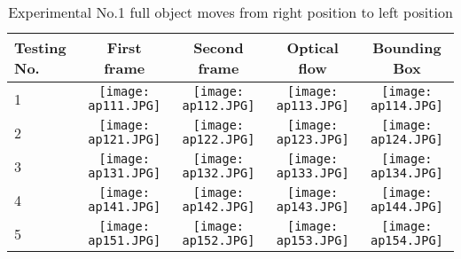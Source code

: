\begin{table}[h]
	\begin{adjustwidth}{-1.2in}{-1.2in}%
		\begin{tabular}{|p{1.1cm}|c|c|c|c|}
			\hline
			Testing No. & First frame & Second frame & Optical flow & Bounding Box \\ \hline
			1 & 
			\texttt{[image: ap111.JPG]} & \texttt{[image: ap112.JPG]} & \texttt{[image: ap113.JPG]} & \texttt{[image: ap114.JPG]} \\
			2 & 
			\texttt{[image: ap121.JPG]} & \texttt{[image: ap122.JPG]} & \texttt{[image: ap123.JPG]} & \texttt{[image: ap124.JPG]} \\
			3 & 
			\texttt{[image: ap131.JPG]} & \texttt{[image: ap132.JPG]} & \texttt{[image: ap133.JPG]} & \texttt{[image: ap134.JPG]} \\
			4 & 
			\texttt{[image: ap141.JPG]} & \texttt{[image: ap142.JPG]} & \texttt{[image: ap143.JPG]} & \texttt{[image: ap144.JPG]} \\
			5 & 
			\texttt{[image: ap151.JPG]} & \texttt{[image: ap152.JPG]} & \texttt{[image: ap153.JPG]} & \texttt{[image: ap154.JPG]} \\
			\hline
		\end{tabular}
		\caption{Experimental No.1 full object moves from right position to left position}
		\label{tab:01}
	\end{adjustwidth}
\end{table}

